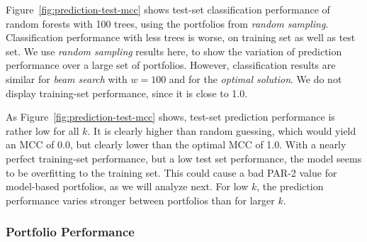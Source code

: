 \documentclass[conference]{IEEEtran}
\begin{document}
Figure~\ref{fig:prediction-test-mcc} shows test-set classification performance of random forests with 100 trees, using the portfolios from \emph{random sampling}.
Classification performance with less trees is worse, on training set as well as test set.
We use \emph{random sampling} results here, to show the variation of prediction performance over a large set of portfolios.
However, classification results are similar for \emph{beam search} with $w=100$ and for the \emph{optimal solution}.
We do not display training-set performance, since it is close to 1.0.

As Figure~\ref{fig:prediction-test-mcc} shows, test-set prediction performance is rather low for all $k$.
It is clearly higher than random guessing, which would yield an MCC of 0.0, but clearly lower than the optimal MCC of 1.0.
With a nearly perfect training-set performance, but a low test set performance, the model seems to be overfitting to the training set.
This could cause a bad PAR-2 value for model-based portfolios, as we will analyze next.
For low $k$, the prediction performance varies stronger between portfolios than for larger $k$.

\subsubsection{Portfolio Performance}
\end{document}
